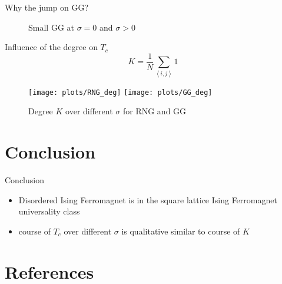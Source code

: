 \documentclass{beamer}
\newcommand{\avg}[1]{\left< #1 \right>}
\begin{document}
        \begin{frame}{Why the jump on GG?}
            \begin{figure}[htbp]
                \centering
                \subfigure{
                    \label{sfig:GGEdge:before}
                    \resizebox{0.43\textwidth}{!}{
                        
                    }
                }
                \subfigure{
                    \label{sfig:GGEdge:after}
                    \resizebox{0.43\textwidth}{!}{
                        
                    }
                }
                \caption
                {
                    Small GG at \(\sigma = 0\) and \(\sigma > 0\)
                }
                \label{fig:GGEdge}
            \end{figure}
        \end{frame}

        \begin{frame}{Influence of the degree on \(T_{c}\)}
            \begin{equation}
                K = \frac{1}{N} \sum_{\avg{i,j}} 1
                \label{eq:degree}
            \end{equation}
            \begin{figure}[htbp]
                \centering
                \subfigure
                {
                    \label{sfig:deg:RNG}
                    \texttt{[image: plots/RNG\_deg]}
                }
                \subfigure
                {
                    \label{sfig:deg:GG}
                    \texttt{[image: plots/GG\_deg]}
                }
                \caption
                {
                    Degree \(K\) over different \(\sigma\) for RNG and GG
                }
                \label{fig:Tc_deg}
            \end{figure}
        \end{frame}

\section{Conclusion}
    \begin{frame}{Conclusion}
        \begin{itemize}[<+->]
            \item Disordered Ising Ferromagnet is in the square lattice Ising Ferromagnet universality class
            \item course of \(T_{c}\) over different \(\sigma\) is qualitative similar to course of \(K\)
        \end{itemize}
    \end{frame}

\section{References}
    \begin{frame}[allowframebreaks]
        
        
    \end{frame}
\end{document}
